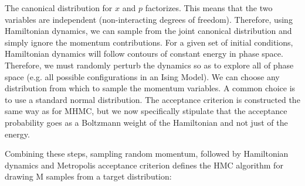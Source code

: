 \documentclass[book.tex]{subfiles}
\begin{document}
The canonical distribution for $ x$ and $ p$ factorizes. This means that the two variables are independent (non-interacting degrees of freedom). Therefore, using Hamiltonian dynamics, we can sample from the joint canonical distribution and simply ignore the momentum contributions. For a given set of initial conditions, Hamiltonian dynamics will follow contours of constant energy in phase space. Therefore, we must randomly perturb the dynamics so as to explore all of phase space (e.g. all possible configurations in an Ising Model). We can choose any distribution from which to sample the momentum variables. A common choice is to use a standard normal distribution.
The acceptance criterion is constructed the same way as for MHMC, but we now specifically stipulate that the acceptance probability goes as a Boltzmann weight of the Hamiltonian and not just of the energy. 

Combining these steps, sampling random momentum, followed by Hamiltonian dynamics and Metropolis acceptance criterion defines the HMC algorithm for drawing M samples from a target distribution:
\end{document}
